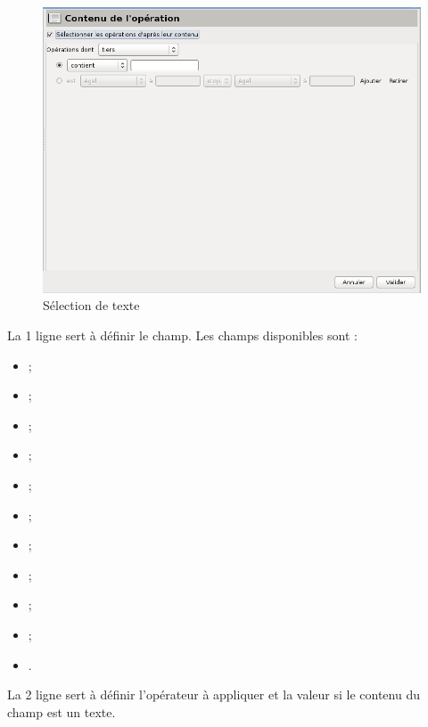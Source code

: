 \ifIllustration
\begin{figure}[htbp]
\begin{center}
\includegraphics[scale=0.5]{image/screenshot/reportcreation_datas_text}
\end{center}
\caption{Sélection de texte}
\label{reportcreation-datas-text-img}
\end{figure}
\fi

La 1 ligne sert à définir le champ. Les champs disponibles sont :

\begin{itemize}
	    \item {} ;
	    \item {} ;
	    \item {} ;
	    \item {} ;
	    \item {} ;
	    \item {} ;
	    \item {} ;
	    \item {} ;
	    \item {} ;
	    \item {} ;
	    \item {}.
\end{itemize}

La 2 ligne sert à définir l'opérateur à appliquer et la valeur si le contenu du champ est un texte. 

